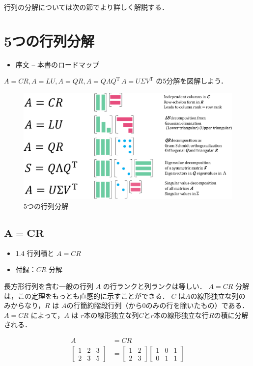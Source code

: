 \documentclass[letterpaper]{article}
\DeclareRobustCommand\transp{^{\mathrm{T}}}
\begin{document}
行列の分解については次の節でより詳しく解説する．

\clearpage

\section{5つの行列分解}

\begin{itemize}
  \item 序文  -- 本書のロードマップ
\end{itemize}
$A=CR, A=LU, A=QR, A=Q \Lambda Q\transp\, A=U \Sigma V\transp$ の5分解を図解しよう．

\begin{figure}[H]
  \includegraphics[keepaspectratio, width=\linewidth]{5-Factorizations.eps}
  \caption{5つの行列分解}
\end{figure}

\clearpage

\subsection{$\boldsymbol{A=CR}$}

\begin{itemize}
  \item 1.4 行列積と $A=CR$
  \item 付録：$CR$ 分解
\end{itemize}

長方形行列を含む一般の行列 $A$ の行ランクと列ランクは等しい．
$A=CR$ 分解は，この定理をもっとも直感的に示すことができる．
$C$ は$A$の線形独立な列のみからなり，$R$ は $A$の行簡約階段行列（から0のみの行を除いたもの）である．
$A=CR$ によって，$A$ は $r$本の線形独立な列$C$と$r$本の線形独立な行$R$の積に分解される．

\begin{equation*}
  \begin{split}
    A &= CR\\
  \begin{bmatrix}
    1 & 2 & 3 \\
    2 & 3 & 5
  \end{bmatrix}
  & =
  \begin{bmatrix}
    1 & 2 \\
    2 & 3
  \end{bmatrix}
  \begin{bmatrix}
    1 & 0 & 1 \\
    0 & 1 & 1
  \end{bmatrix}
\end{split}
\end{equation*}
\end{document}
